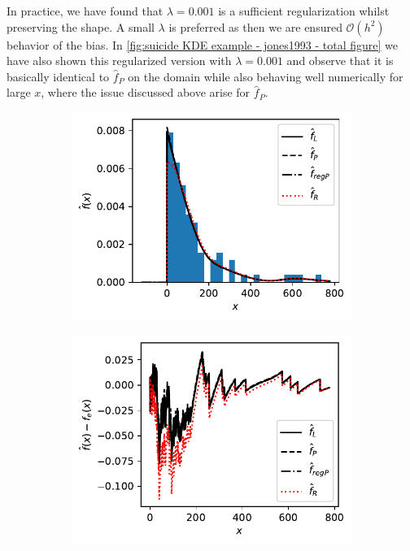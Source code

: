 \documentclass[../Thesis.tex]{subfiles}
\begin{document}
In practice, we have found that $\lambda = 0.001$ is a sufficient regularization whilst preserving the shape. A small $\lambda$ is preferred as then we are ensured $\mathcal{O}\left(h^2\right)$ behavior of the bias. In \autoref{fig:suicide KDE example - jones1993 - total figure} we have also shown this regularized version with $\lambda = 0.001$ and observe that it is basically identical to $\hat{f}_P$ on the domain while also behaving well numerically for large $x$, where the issue discussed above arise for $\hat{f}_P$.
\begin{figure}[ht]
    \centering
    \begin{subfigure}[t]{0.49\linewidth}
        \centering
        \includegraphics[width = \linewidth]{figures/MI estimation/suicide data example - Jones1993.pdf}
        \caption{}
        \label{fig:suicide KDE example - jones1993}
    \end{subfigure}
    \hfill
    \begin{subfigure}[t]{0.49\linewidth}
        \centering
        \includegraphics[width = \linewidth]{figures/MI estimation/suicide data example - Jones1993 - Kolmogorov Smirnov.pdf}
        \caption{}
        \label{fig:Kolmogorov Smirnov DN - jones1993}
    \end{subfigure}
    \caption{}
    \label{fig:suicide KDE example - jones1993 - total figure}
\end{figure}
\end{document}
